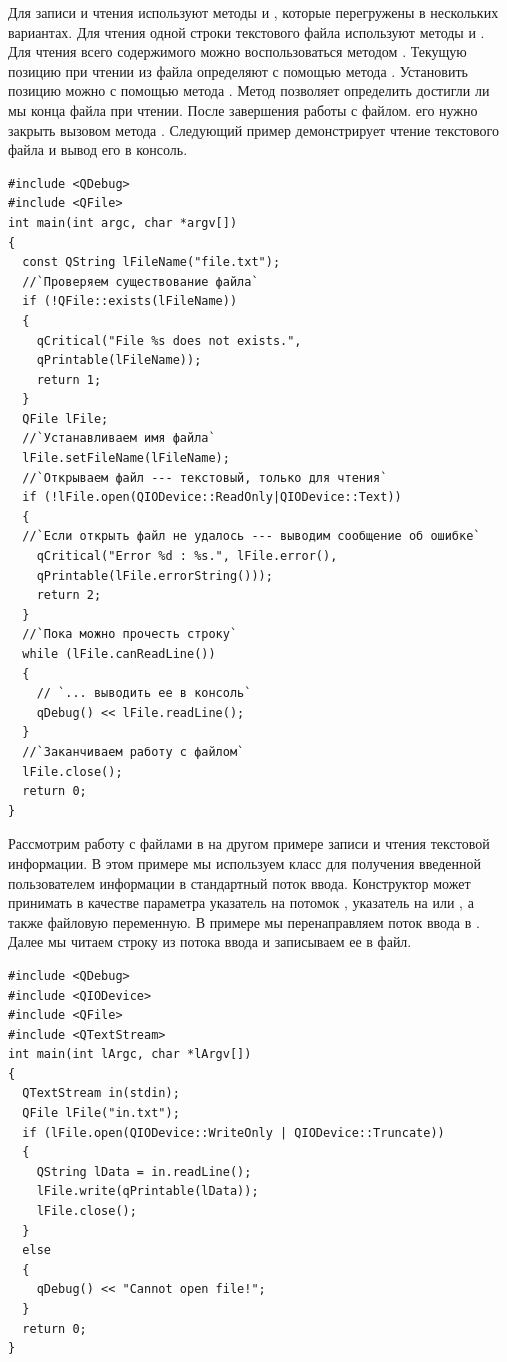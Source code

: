Для записи и чтения используют методы
 и , которые перегружены в нескольких вариантах. Для
чтения одной строки текстового файла используют методы  и .
Для чтения всего содержимого можно воспользоваться методом . Текущую
позицию при чтении из файла определяют с помощью метода . Установить позицию можно с
помощью метода . Метод  позволяет определить достигли ли
мы конца файла при чтении. После завершения работы с файлом. его нужно закрыть вызовом метода .
Следующий пример демонстрирует чтение текстового файла и вывод его в консоль.
\begin{lstlisting}
#include <QDebug>
#include <QFile>
int main(int argc, char *argv[])
{
  const QString lFileName("file.txt");
  //`Проверяем существование файла`
  if (!QFile::exists(lFileName))
  {
    qCritical("File %s does not exists.",
    qPrintable(lFileName));
    return 1;
  }
  QFile lFile;
  //`Устанавливаем имя файла`
  lFile.setFileName(lFileName);
  //`Открываем файл --- текстовый, только для чтения`
  if (!lFile.open(QIODevice::ReadOnly|QIODevice::Text))
  {
  //`Если открыть файл не удалось --- выводим сообщение об ошибке`
    qCritical("Error %d : %s.", lFile.error(),
    qPrintable(lFile.errorString()));
    return 2;
  }
  //`Пока можно прочесть строку`
  while (lFile.canReadLine())
  {
    // `... выводить ее в консоль`
    qDebug() << lFile.readLine();
  }
  //`Заканчиваем работу с файлом`
  lFile.close();
  return 0;
}
\end{lstlisting}

Рассмотрим работу с файлами в  на другом примере
записи и чтения текстовой информации. В этом примере мы используем класс
 для получения введенной пользователем
информации в стандартный поток ввода. Конструктор  может принимать в качестве
параметра указатель на потомок , указатель на 
или , а также файловую переменную. В примере мы перенаправляем
поток ввода в . Далее мы читаем строку
из потока ввода и записываем ее в файл.
\begin{lstlisting}
#include <QDebug>
#include <QIODevice>
#include <QFile>
#include <QTextStream>
int main(int lArgc, char *lArgv[])
{
  QTextStream in(stdin);
  QFile lFile("in.txt");
  if (lFile.open(QIODevice::WriteOnly | QIODevice::Truncate))
  {
    QString lData = in.readLine();
    lFile.write(qPrintable(lData));
    lFile.close();
  }
  else
  {
    qDebug() << "Cannot open file!";
  }
  return 0;
}
\end{lstlisting}

